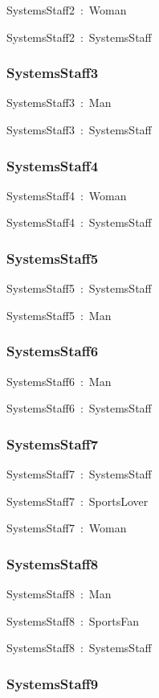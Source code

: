 \documentclass{article}
\begin{document}
SystemsStaff2~:~Woman

SystemsStaff2~:~SystemsStaff

\subsubsection*{SystemsStaff3}

SystemsStaff3~:~Man

SystemsStaff3~:~SystemsStaff

\subsubsection*{SystemsStaff4}

SystemsStaff4~:~Woman

SystemsStaff4~:~SystemsStaff

\subsubsection*{SystemsStaff5}

SystemsStaff5~:~SystemsStaff

SystemsStaff5~:~Man

\subsubsection*{SystemsStaff6}

SystemsStaff6~:~Man

SystemsStaff6~:~SystemsStaff

\subsubsection*{SystemsStaff7}

SystemsStaff7~:~SystemsStaff

SystemsStaff7~:~SportsLover

SystemsStaff7~:~Woman

\subsubsection*{SystemsStaff8}

SystemsStaff8~:~Man

SystemsStaff8~:~SportsFan

SystemsStaff8~:~SystemsStaff

\subsubsection*{SystemsStaff9}
\end{document}
